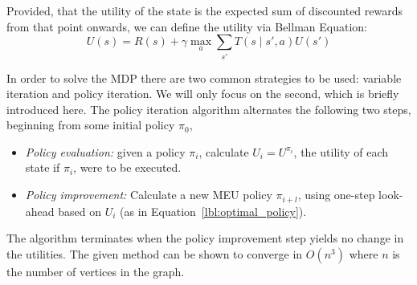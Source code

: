 Provided, that the utility of the state is the expected sum of discounted
rewards from that point onwards, we can define the utility via Bellman
Equation:
\begin{equation}
\label{lbl:bellman_equation}
U(s) = R(s) + \gamma \max_a \sum_{s'}T(s \mid s', a)U(s')
\end{equation}

In order to solve the MDP there are two common strategies to be used: variable
iteration and policy iteration. We will only focus on the second, which is
briefly introduced here. The policy iteration algorithm alternates the
following two steps, beginning from some initial policy $\pi_0$,

\begin{itemize}
    \item \emph{Policy evaluation:} given a policy $\pi_i$,
    calculate $U_i = U^{\pi_i}$, the utility of each state if $\pi_i$, were to be
    executed.
    \item \emph{Policy improvement:} Calculate a new MEU policy
    $\pi_{i+l}$, using one-step look- ahead based on $U_i$ (as in
    Equation~\ref{lbl:optimal_policy}).
\end{itemize}

The algorithm terminates when the policy improvement step yields no change in
the utilities. The given method can be shown to converge in $O(n^3)$ where $n$
is the number of vertices in the graph.




